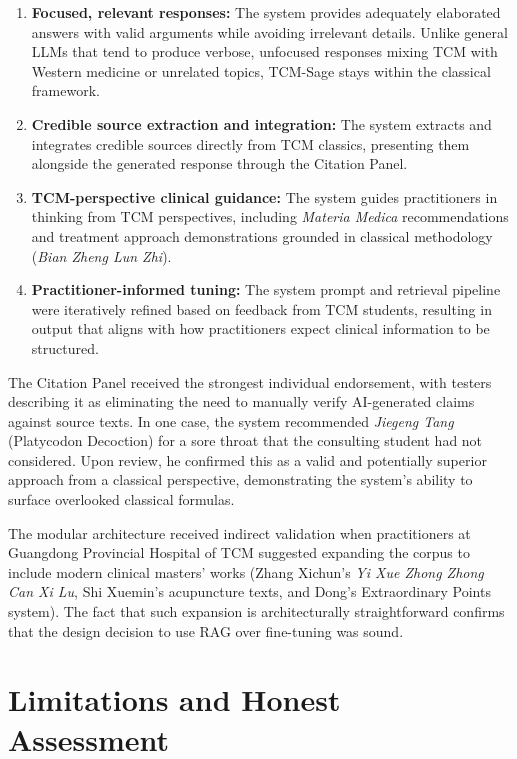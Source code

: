 \begin{enumerate}
    \item \textbf{Focused, relevant responses:} The system provides adequately elaborated answers with valid arguments while avoiding irrelevant details. Unlike general LLMs that tend to produce verbose, unfocused responses mixing TCM with Western medicine or unrelated topics, TCM-Sage stays within the classical framework.
    \item \textbf{Credible source extraction and integration:} The system extracts and integrates credible sources directly from TCM classics, presenting them alongside the generated response through the Citation Panel.
    \item \textbf{TCM-perspective clinical guidance:} The system guides practitioners in thinking from TCM perspectives, including \textit{Materia Medica} recommendations and treatment approach demonstrations grounded in classical methodology (\textit{Bian Zheng Lun Zhi}).
    \item \textbf{Practitioner-informed tuning:} The system prompt and retrieval pipeline were iteratively refined based on feedback from TCM students, resulting in output that aligns with how practitioners expect clinical information to be structured.
\end{enumerate}

The Citation Panel received the strongest individual endorsement, with testers describing it as eliminating the need to manually verify AI-generated claims against source texts. In one case, the system recommended \textit{Jiegeng Tang} (Platycodon Decoction) for a sore throat that the consulting student had not considered. Upon review, he confirmed this as a valid and potentially superior approach from a classical perspective, demonstrating the system's ability to surface overlooked classical formulas.

The modular architecture received indirect validation when practitioners at Guangdong Provincial Hospital of TCM suggested expanding the corpus to include modern clinical masters' works (Zhang Xichun's \textit{Yi Xue Zhong Zhong Can Xi Lu}, Shi Xuemin's acupuncture texts, and Dong's Extraordinary Points system). The fact that such expansion is architecturally straightforward confirms that the design decision to use RAG over fine-tuning was sound.

\section{Limitations and Honest Assessment}

